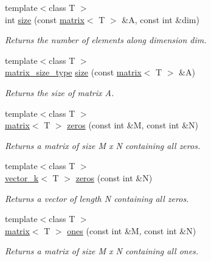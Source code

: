 \begin{DoxyCompactItemize}
\item 
{\footnotesize template$<$class T $>$ }\\int \hyperlink{namespacekeycpp_a2824156817719ffe96a842dd0ef27ae5}{size} (const \hyperlink{classkeycpp_1_1matrix}{matrix}$<$ T $>$ \&A, const int \&dim)
\begin{DoxyCompactList}\small\item\em Returns the number of elements along dimension dim. \end{DoxyCompactList}\item 
{\footnotesize template$<$class T $>$ }\\\hyperlink{structkeycpp_1_1matrix__size__type}{matrix\-\_\-size\-\_\-type} \hyperlink{namespacekeycpp_ae713df143a5e71da166f450e01a536e2}{size} (const \hyperlink{classkeycpp_1_1matrix}{matrix}$<$ T $>$ \&A)
\begin{DoxyCompactList}\small\item\em Returns the size of matrix A. \end{DoxyCompactList}\item 
{\footnotesize template$<$class T $>$ }\\\hyperlink{classkeycpp_1_1matrix}{matrix}$<$ T $>$ \hyperlink{namespacekeycpp_a5699c522088657287bf0ac01173b716c}{zeros} (const int \&M, const int \&N)
\begin{DoxyCompactList}\small\item\em Returns a matrix of size M x N containing all zeros. \end{DoxyCompactList}\item 
{\footnotesize template$<$class T $>$ }\\\hyperlink{classkeycpp_1_1vector__k}{vector\-\_\-k}$<$ T $>$ \hyperlink{namespacekeycpp_ac00f5a8f1eba98722c1aac6b637a18c7}{zeros} (const int \&N)
\begin{DoxyCompactList}\small\item\em Returns a vector of length N containing all zeros. \end{DoxyCompactList}\item 
{\footnotesize template$<$class T $>$ }\\\hyperlink{classkeycpp_1_1matrix}{matrix}$<$ T $>$ \hyperlink{namespacekeycpp_a388f91a0ccf34978ef9403ccd0c680bf}{ones} (const int \&M, const int \&N)
\begin{DoxyCompactList}\small\item\em Returns a matrix of size M x N containing all ones. \end{DoxyCompactList}\item 

\end{DoxyCompactItemize}
